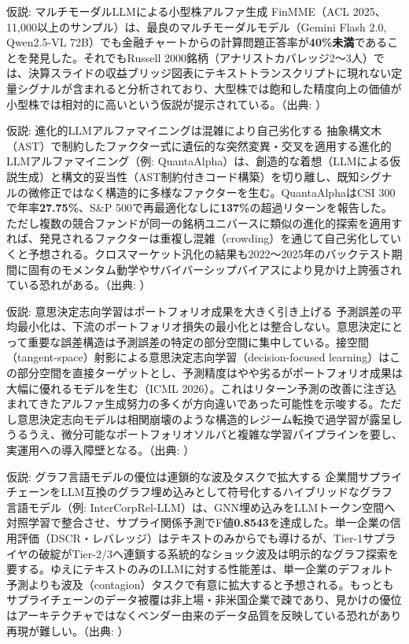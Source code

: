 \begin{insight}{仮説: マルチモーダルLLMによる小型株アルファ生成}
FinMME（ACL 2025、11,000以上のサンプル）は、最良のマルチモーダルモデル（Gemini Flash 2.0, Qwen2.5-VL 72B）でも金融チャートからの計算問題正答率が\textbf{40\%未満}であることを発見した。それでもRussell 2000銘柄（アナリストカバレッジ2〜3人）では、決算スライドの収益ブリッジ図表にテキストトランスクリプトに現れない定量シグナルが含まれると分析されており、大型株では飽和した精度向上の価値が小型株では相対的に高いという仮説が提示されている。（出典: \cite{finmme2025}）
\end{insight}

\begin{insight}{仮説: 進化的LLMアルファマイニングは混雑により自己劣化する}
抽象構文木（AST）で制約したファクター式に遺伝的な突然変異・交叉を適用する進化的LLMアルファマイニング（例: QuantaAlpha）は、創造的な着想（LLMによる仮説生成）と構文的妥当性（AST制約付きコード構築）を切り離し、既知シグナルの微修正ではなく構造的に多様なファクターを生む。QuantaAlphaはCSI 300で年率\textbf{27.75\%}、S\&P 500で再最適化なしに\textbf{137\%}の超過リターンを報告した。ただし複数の競合ファンドが同一の銘柄ユニバースに類似の進化的探索を適用すれば、発見されるファクターは重複し混雑（crowding）を通じて自己劣化していくと予想される。クロスマーケット汎化の結果も2022〜2025年のバックテスト期間に固有のモメンタム動学やサバイバーシップバイアスにより見かけ上誇張されている恐れがある。（出典: \cite{quantaalpha2026}）
\end{insight}

\begin{insight}{仮説: 意思決定志向学習はポートフォリオ成果を大きく引き上げる}
予測誤差の平均最小化は、下流のポートフォリオ損失の最小化とは整合しない。意思決定にとって重要な誤差構造は予測誤差の特定の部分空間に集中している。接空間（tangent-space）射影による意思決定志向学習（decision-focused learning）はこの部分空間を直接ターゲットとし、予測精度はやや劣るがポートフォリオ成果は大幅に優れるモデルを生む（ICML 2026）。これはリターン予測の改善に注ぎ込まれてきたアルファ生成努力の多くが方向違いであった可能性を示唆する。ただし意思決定志向モデルは相関崩壊のような構造的レジーム転換で過学習が露呈しうるうえ、微分可能なポートフォリオソルバと複雑な学習パイプラインを要し、実運用への導入障壁となる。（出典: \cite{decisionfocused2026}）
\end{insight}

\begin{insight}{仮説: グラフ言語モデルの優位は連鎖的な波及タスクで拡大する}
企業間サプライチェーンをLLM互換のグラフ埋め込みとして符号化するハイブリッドなグラフ言語モデル（例: InterCorpRel-LLM）は、GNN埋め込みをLLMトークン空間へ対照学習で整合させ、サプライ関係予測でF値\textbf{0.8543}を達成した。単一企業の信用評価（DSCR・レバレッジ）はテキストのみからでも導けるが、Tier-1サプライヤの破綻がTier-2/3へ連鎖する系統的なショック波及は明示的なグラフ探索を要する。ゆえにテキストのみのLLMに対する性能差は、単一企業のデフォルト予測よりも波及（contagion）タスクで有意に拡大すると予想される。もっともサプライチェーンのデータ被覆は非上場・非米国企業で疎であり、見かけの優位はアーキテクチャではなくベンダー由来のデータ品質を反映している恐れがあり再現が難しい。（出典: \cite{intercorprel2025}）
\end{insight}

